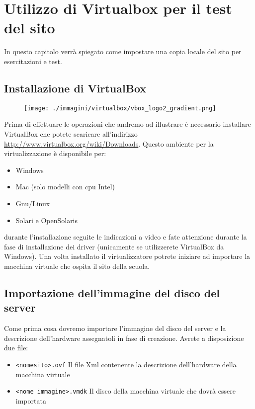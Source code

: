 \chapter[VirtualBox]{Utilizzo di Virtualbox per il test del sito}

In questo capitolo verrà spiegato come impostare una copia locale del sito per esercitazioni e test.


\section{Installazione di VirtualBox}
\begin{figure}[H]
 \texttt{[image: ./immagini/virtualbox/vbox\_logo2\_gradient.png]}
\end{figure}

Prima di effettuare le operazioni che andremo ad illustrare è necessario installare VirtualBox che potete scaricare all'indirizzo \url{http://www.virtualbox.org/wiki/Downloads}. Questo ambiente per la virtualizzazione è disponibile per:
\begin{itemize}
\item Windows
\item Mac (solo modelli con cpu Intel)
\item Gnu/Linux
\item Solari e OpenSolaris
\end{itemize}



durante l'installazione seguite le indicazioni a video e fate attenzione durante la fase di installazione dei driver (unicamente se utilizzerete VirtualBox da Windows). Una volta installato il virtualizzatore potrete iniziare ad importare la macchina virtuale che ospita il sito della scuola.

\section{Importazione dell'immagine del  disco del server}
Come prima cosa dovremo importare l'immagine del disco del server e la descrizione dell'hardware assegnatoli in fase di creazione. Avrete a disposizione due file:
\begin{itemize}
\item \texttt{<nomesito>.ovf} Il file Xml contenente la descrizione dell'hardware della macchina virtuale
\item \texttt{<nome immagine>.vmdk} Il disco della macchina virtuale che dovrà essere importata
\end{itemize}

